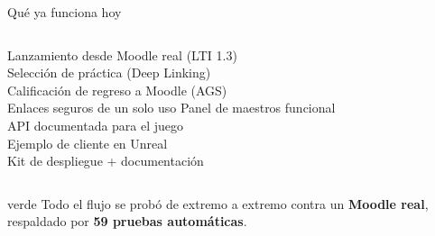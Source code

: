 \begin{frame}{Qu\'e ya funciona hoy}
\vspace{0.35cm}
\newcommand{\ok}{\textcolor{verde}{\large\textbf{\checkmark}}\;}
\begin{columns}[T]
\ok Lanzamiento desde Moodle real (LTI 1.3)\\[7pt]
\ok Selecci\'on de pr\'actica (Deep Linking)\\[7pt]
\ok Calificaci\'on de regreso a Moodle (AGS)\\[7pt]
\ok Enlaces seguros de un solo uso
\ok Panel de maestros funcional\\[7pt]
\ok API documentada para el juego\\[7pt]
\ok Ejemplo de cliente en Unreal\\[7pt]
\ok Kit de despliegue + documentaci\'on
\end{columns}
\vspace{0.5cm}
\begin{center}
\begin{calloutbox}{verde}
\demi Todo el flujo se prob\'o de extremo a extremo contra un \textbf{Moodle real},
respaldado por \textbf{59 pruebas autom\'aticas}.
\end{calloutbox}
\end{center}
\end{frame}

